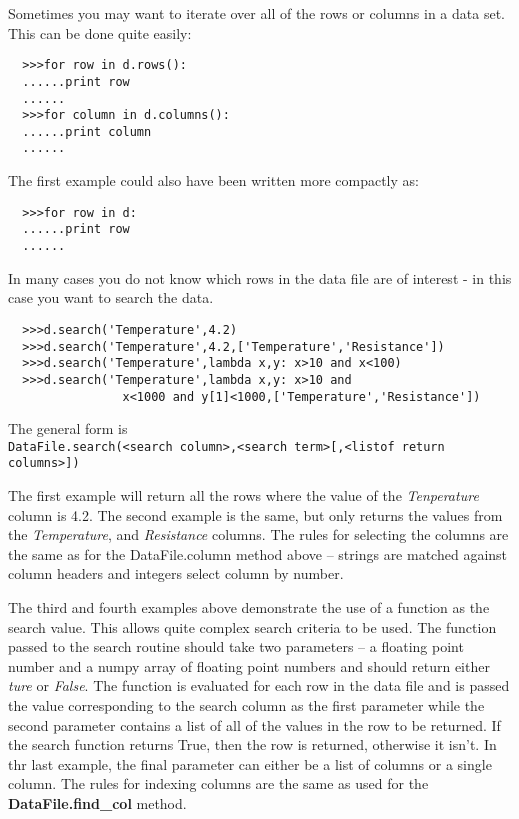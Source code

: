 \documentclass[a4paper,11pt]{scrartcl}
\begin{document}
Sometimes you may want to iterate over all of the rows or columns in a data set.
This can be done quite easily:
\begin{verbatim}
  >>>for row in d.rows():
  ......print row
  ......
  >>>for column in d.columns():
  ......print column
  ......
\end{verbatim}
The first example could also have been written more compactly as:
\begin{verbatim}
  >>>for row in d:
  ......print row
  ......
\end{verbatim}

In many cases you do not know which rows in the data file are of interest - in
this case you want to search the data.
\begin{verbatim}
  >>>d.search('Temperature',4.2)
  >>>d.search('Temperature',4.2,['Temperature','Resistance'])
  >>>d.search('Temperature',lambda x,y: x>10 and x<100)
  >>>d.search('Temperature',lambda x,y: x>10 and
                x<1000 and y[1]<1000,['Temperature','Resistance'])
\end{verbatim}
The general form is \\\verb:DataFile.search(<search column>,<search term>[,<listof return columns>]):

The first example will return all the rows where the value of the
\textit{Tenperature} column is 4.2. The second example is the same, but only
returns the values from the \textit{Temperature}, and \textit{Resistance}
columns. The rules for selecting the columns are the same as for the
DataFile.column method above -- strings are matched against column headers and
integers select column by number.

The third and fourth examples above demonstrate the use of a function as the
search value. This allows quite complex search criteria to be used. The function
passed to the search routine should take two parameters -- a floating point
number and a numpy array of floating point numbers and should return either
\textit{ture} or \textit{False}. The function is evaluated for each row in the
data file and is passed the value corresponding to the search column as the
first parameter while the second parameter contains a list of all of the values
in the row to be returned. If the search function returns True, then the row is
returned, otherwise it isn't. In thr last example, the final parameter can
either be a list of columns or a single column. The rules for indexing columns
are the same as used for the \textbf{DataFile.find\_col} method.
\end{document}
